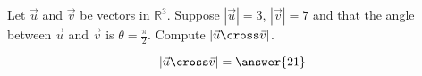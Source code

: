 \documentclass{ximera}
\author{Gregory Hartman \and Matthew Carr}
\begin{document}
\begin{exercise}
Let $\vec{u}$ and $\vec{v}$ be vectors in $\mathbb{R}^3$. Suppose $|\vec{u}|=3$, $|\vec{v}|=7$ and that the angle between $\vec{u}$ and $\vec{v}$ is $\theta=\frac{\pi}{2}$. Compute $|\vec{u}\cross\vec{v}|$.

\begin{prompt}
\[
|\vec{u}\cross\vec{v}|=\answer{21}
\]
\end{prompt}


\end{exercise}
\end{document}
